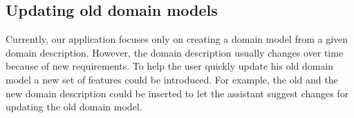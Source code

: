 %
%
%
%
%
%
%
%
%


\subsection{Updating old domain models}

Currently, our application focuses only on creating a domain model from a given domain description. However, the domain description usually changes over time because of new requirements. To help the user quickly update his old domain model a new set of features could be introduced. For example, the old and the new domain description could be inserted to let the assistant suggest changes for updating the old domain model.


